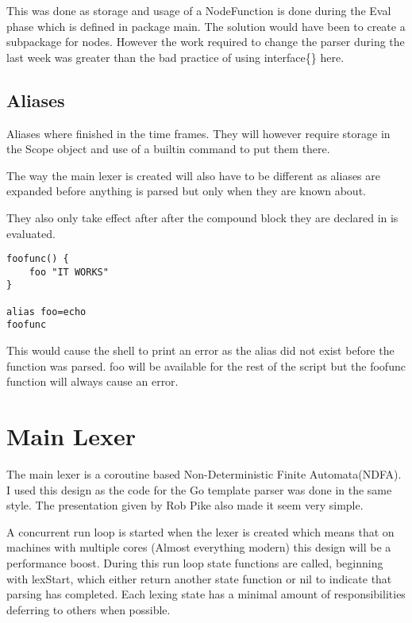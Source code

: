This was done as storage and usage of a NodeFunction is done during the Eval phase which is defined in package main.
The solution would have been to create a subpackage for nodes.
However the work required to change the parser during the last week was greater than the bad practice of using interface\{\} here.

\subsection{Aliases}
Aliases where finished in the time frames.
They will however require storage in the Scope object and use of a builtin command to put them there.

The way the main lexer is created will also have to be different as aliases are expanded before anything is parsed but only when they are known about.

They also only take effect after after the compound block they are declared in is evaluated.
\begin{verbatim}
foofunc() {
    foo "IT WORKS"
}

alias foo=echo
foofunc
\end{verbatim}
This would cause the shell to print an error as the alias did not exist before the function was parsed.
foo will be available for the rest of the script but the foofunc function will always cause an error.

\section{Main Lexer}
The main lexer is a coroutine based Non-Deterministic Finite Automata(NDFA).
I used this design as the code for the Go template parser was done in the same style.
The presentation given by Rob Pike\cite{PIKE-LEXING-VIDEO} also made it seem very simple.

A concurrent run loop is started when the lexer is created which means that on machines with multiple cores (Almost everything modern) this design will be a performance boost.
During this run loop state functions are called, beginning with lexStart, which either return another state function or nil to indicate that parsing has completed. 
Each lexing state has a minimal amount of responsibilities deferring to others when possible.

